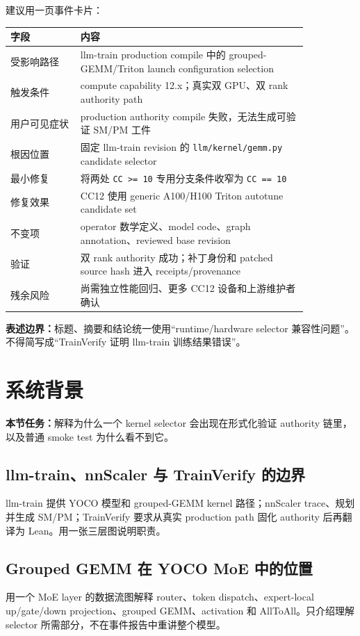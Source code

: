 \documentclass[11pt,a4paper]{ctexart}
\newcommand{\contract}[1]{\par\smallskip\noindent\colorbox{light}{\parbox{0.95\linewidth}{\textbf{本节任务：}#1}}\par\smallskip}
\newcommand{\boundary}[1]{\par\noindent\textbf{表述边界：}#1\par}
\begin{document}
建议用一页事件卡片：
\begin{longtable}{p{0.20\linewidth}p{0.65\linewidth}}
\toprule
字段 & 内容 \\
\midrule
受影响路径 & llm-train production compile 中的 grouped-GEMM/Triton launch configuration selection \\
触发条件 & compute capability 12.x；真实双 GPU、双 rank authority path \\
用户可见症状 & production authority compile 失败，无法生成可验证 SM/PM 工件 \\
根因位置 & 固定 llm-train revision 的 \texttt{llm/kernel/gemm.py} candidate selector \\
最小修复 & 将两处 \texttt{CC >= 10} 专用分支条件收窄为 \texttt{CC == 10} \\
修复效果 & CC12 使用 generic A100/H100 Triton autotune candidate set \\
不变项 & operator 数学定义、model code、graph annotation、reviewed base revision \\
验证 & 双 rank authority 成功；补丁身份和 patched source hash 进入 receipts/provenance \\
残余风险 & 尚需独立性能回归、更多 CC12 设备和上游维护者确认 \\
\bottomrule
\end{longtable}

\boundary{标题、摘要和结论统一使用“runtime/hardware selector 兼容性问题”。不得简写成“TrainVerify 证明 llm-train 训练结果错误”。}

\section{系统背景}
\contract{解释为什么一个 kernel selector 会出现在形式化验证 authority 链里，以及普通 smoke test 为什么看不到它。}

\subsection{llm-train、nnScaler 与 TrainVerify 的边界}
llm-train 提供 YOCO 模型和 grouped-GEMM kernel 路径；nnScaler trace、规划并生成 SM/PM；TrainVerify 要求从真实 production path 固化 authority 后再翻译为 Lean。用一张三层图说明职责。

\subsection{Grouped GEMM 在 YOCO MoE 中的位置}
用一个 MoE layer 的数据流图解释 router、token dispatch、expert-local up/gate/down projection、grouped GEMM、activation 和 AllToAll。只介绍理解 selector 所需部分，不在事件报告中重讲整个模型。
\end{document}
